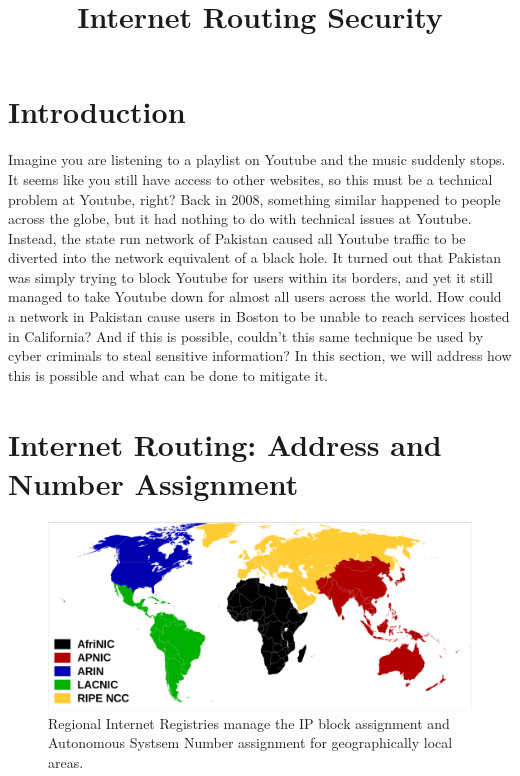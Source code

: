 \documentclass[conference]{IEEEtran}
\begin{document}
\title{Internet Routing Security}

\maketitle

\section{Introduction}
Imagine you are listening to a playlist on Youtube and the music suddenly stops.  It seems like you still have access to other websites, so this must be a technical problem at Youtube, right?  Back in 2008, something similar happened to people across the globe, but it had nothing to do with technical issues at Youtube.  Instead, the state run network of Pakistan caused all Youtube traffic to be diverted into the network equivalent of a black hole.  It turned out that Pakistan was simply trying to block Youtube for users within its borders, and yet it still managed to take Youtube down for almost all users across the world.  How could a network in Pakistan cause users in Boston to be unable to reach services hosted in California?  And if this is possible, couldn't this same technique be used by cyber criminals to steal sensitive information?  In this section, we will address how this is possible and what can be done to mitigate it.

\section{Internet Routing: Address and Number Assignment}
\begin{figure}
  \includegraphics[width=\linewidth]{images/rirs.png}
  \caption{Regional Internet Registries manage the IP block assignment and Autonomous Systsem Number assignment for geographically local areas.}
  \label{fig:rirs}
\end{figure}
\end{document}
